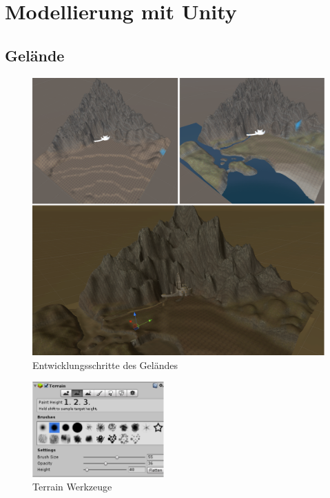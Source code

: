 \section{Modellierung mit Unity}

\subsection{Gelände}
\begin{figure}[h]
\centering
\includegraphics[width=0.95\linewidth]{Abbildungen/Unity/TerrainProgress}
\caption{Entwicklungsschritte des Geländes}
\label{fig:TerrainProgress}
\end{figure}

\begin{figure}
	\vspace{-20pt}
	\begin{center}
		\includegraphics[width=0.45\textwidth]{Abbildungen/Unity/TerrainTool}
	\end{center}
	\caption{Terrain Werkzeuge}
	\label{fig:TerrainWerkzeuge}
\end{figure}

